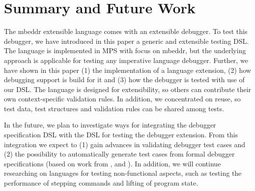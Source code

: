 \section{Summary and Future Work}

The mbeddr extensible language comes with an extensible debugger.
To test this debugger, we have introduced in this paper a generic and
extensible testing \ac{DSL}.
The language is implemented in \ac{MPS} with focus on mbeddr, but the
underlying approach is applicable for testing any imperative language debugger. Further, we
have shown in this paper (1) the implementation of a language extension, (2) how
debugging support is build for it and (3) how the debugger is tested with use of
our \ac{DSL}. The language is designed for extensibility, so others can contribute
their own context-specific validation rules. In addition, we concentrated on
reuse, so test data, test structures and validation rules can be shared among
tests.

In the future, we plan to investigate ways for integrating the debugger
specification \ac{DSL} with the \ac{DSL} for testing the debugger extension. From this
integration we expect to (1) gain advances in validating debugger test cases and
(2) the possibility to automatically generate test cases from formal debugger
specifications (based on work
from \cite{conf/kbse/WuG05}, \cite{henriques05} and \cite{journals/spe/WuGM08}).
In addition, we will continue
researching on languages for testing non-functional aspects, such as testing the
performance of stepping commands and lifting of program state.